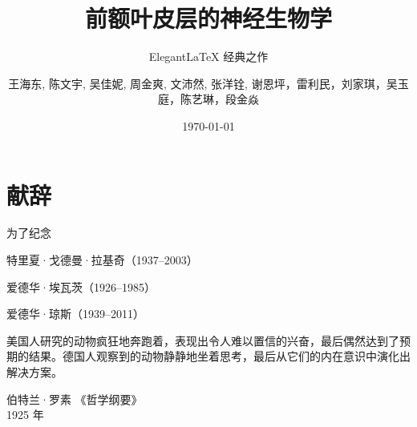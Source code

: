 \documentclass[cn,10pt,citestyle=gb7714-2015, bibstyle=gb7714-2015]{elegantbook}
\title{前额叶皮层的神经生物学}
\subtitle{Elegant\LaTeX{} 经典之作}
\author{王海东, 陈文宇, 吴佳妮, 周金爽, 文沛然, 张洋铨, 谢恩坪，雷利民，刘家琪，吴玉庭，陈艺琳，段金焱}
\institute{OpenHUTB}
\date{\today}
\begin{document}
\maketitle
\frontmatter

\chapter*{献辞}



\begin{center}
为了纪念

特里夏·戈德曼·拉基奇（1937–2003）

爱德华·埃瓦茨（1926–1985）

爱德华·琼斯（1939–2011）
\end{center}


\vskip 1.5cm

美国人研究的动物疯狂地奔跑着，表现出令人难以置信的兴奋，最后偶然达到了预期的结果。德国人观察到的动物静静地坐着思考，最后从它们的内在意识中演化出解决方案。


\vskip 0.5cm


\vskip 1.5cm

\begin{flushright}
伯特兰·罗素  《哲学纲要》\\
1925 年
\end{flushright}

\tableofcontents

\mainmatter

















\nocite{*} 
\printbibliography
\end{document}
